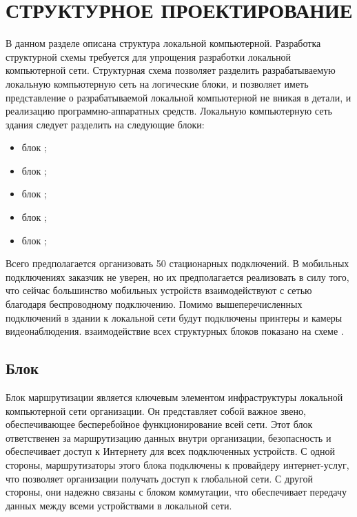 \section{СТРУКТУРНОЕ ПРОЕКТИРОВАНИЕ}
\label{sec:sys}

В данном разделе описана структура локальной компьютерной. Разработка структурной схемы требуется 
для упрощения разработки локальной компьютерной сети. Структурная схема позволяет разделить
разрабатываемую локальную компьютерную сеть на логические блоки, и позволяет иметь представление о разрабатываемой 
локальной компьютерной не вникая в детали, и реализацию программно-аппаратных средств. Локальную компьютерную сеть 
здания следует разделить на следующие блоки:

\begin{itemize}
    \item блок \blockRoute;
    \item блок \blockSwith;
    \item блок \blockDevices;
    \item блок \blockVideo;
    \item блок \blockAccessPoint;
\end{itemize}

Всего предполагается организовать 50 стационарных подключений. В мобильных подключениях заказчик не уверен, 
но их предполагается реализовать в силу того, что сейчас большинство мобильных устройств взаимодействуют с сетью благодаря 
беспроводному подключению. Помимо вышеперечисленных подключений в здании к локальной сети будут подключены принтеры и камеры видеонаблюдения.
взаимодействие всех структурных блоков показано на схеме \structScheme.

\subsection{Блок \blockRoute}   

Блок маршрутизации является ключевым элементом инфраструктуры локальной компьютерной сети организации. Он представляет собой важное звено, 
обеспечивающее бесперебойное функционирование всей сети. Этот блок ответственен за маршрутизацию данных внутри организации, безопасность и обеспечивает 
доступ к Интернету для всех подключенных устройств.
С одной стороны, маршрутизаторы этого блока подключены к провайдеру интернет-услуг, что позволяет организации получать доступ к глобальной сети. 
С другой стороны, они надежно связаны с блоком коммутации, что обеспечивает передачу данных между всеми устройствами в локальной сети.

